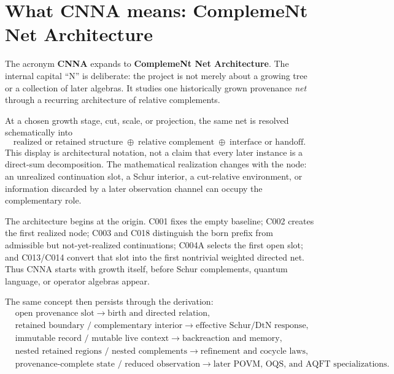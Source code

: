 \section*{What CNNA means: ComplemeNt Net Architecture}

The acronym \textbf{CNNA} expands to \textbf{ComplemeNt Net Architecture}.  The internal capital ``N'' is deliberate: the project is not merely about a growing tree or a collection of later algebras.  It studies one historically grown provenance \emph{net} through a recurring architecture of relative complements.

At a chosen growth stage, cut, scale, or projection, the same net is resolved schematically into
\[
  \text{realized or retained structure}
  \;\oplus\;
  \text{relative complement}
  \;\oplus\;
  \text{interface or handoff}.
\]
This display is architectural notation, not a claim that every later instance is a direct-sum decomposition.  The mathematical realization changes with the node: an unrealized continuation slot, a Schur interior, a cut-relative environment, or information discarded by a later observation channel can occupy the complementary role.

The architecture begins at the origin.  C001 fixes the empty baseline; C002 creates the first realized node; C003 and C018 distinguish the born prefix from admissible but not-yet-realized continuations; C004A selects the first open slot; and C013/C014 convert that slot into the first nontrivial weighted directed net.  Thus CNNA starts with growth itself, before Schur complements, quantum language, or operator algebras appear.

The same concept then persists through the derivation:
\[
\begin{aligned}
  &\text{open provenance slot}
  \longrightarrow \text{birth and directed relation},\\
  &\text{retained boundary / complementary interior}
  \longrightarrow \text{effective Schur/DtN response},\\
  &\text{immutable record / mutable live context}
  \longrightarrow \text{backreaction and memory},\\
  &\text{nested retained regions / nested complements}
  \longrightarrow \text{refinement and cocycle laws},\\
  &\text{provenance-complete state / reduced observation}
  \longrightarrow \text{later POVM, OQS, and AQFT specializations}.
\end{aligned}
\]

